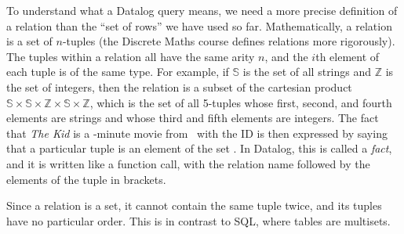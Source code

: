 To understand what a Datalog query means, we need a more precise definition of a relation than the ``set of rows'' we have used so far.
Mathematically, a relation is a set of $n$-tuples (the Discrete Maths course defines relations more rigorously).
The tuples within a relation all have the same arity $n$, and the $i$th element of each tuple is of the same type.
For example, if $\mathbb{S}$ is the set of all strings and $\mathbb{Z}$ is the set of integers, then the  relation is a subset of the cartesian product $\mathbb{S} \times \mathbb{S} \times \mathbb{Z} \times \mathbb{S} \times \mathbb{Z}$, which is the set of all 5-tuples whose first, second, and fourth elements are strings and whose third and fifth elements are integers.
The fact that \emph{The Kid} is a \kidfactminutes-minute movie from \kidfactyear\ with the ID \texttt{\kidfactid} is then expressed by saying that a particular tuple is an element of the set .
In Datalog, this is called a \emph{fact}, and it is written like a function call, with the relation name followed by the elements of the tuple in brackets.

Since a relation is a set, it cannot contain the same tuple twice, and its tuples have no particular order.
This is in contrast to SQL, where tables are multisets.

